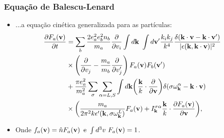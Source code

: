 \documentclass[10pt,aspectratio=1610,lualatex]{beamer}
\begin{document}
\begin{frame}
  \frametitle{Equação de Balescu-Lenard}
  \begin{itemize}
    \item ...a equação cinética generalizada para as partículas:
    \begin{equation}
      \begin{split}
	\frac{\partial F_a({\bf v})}{\partial t}
	&=\sum_b\frac{2e_a^2e_b^2n_b}{m_a}
	\frac{\partial }{\partial v_i}
	\int d{\bf k}\ \int d{\bf v'}\frac{k_ik_j}{k^4}
	\frac{\delta({\bf k \cdot v - k \cdot v'})}
	{|\epsilon({\bf k, k\cdot v})|^2}\\
	&\times \left(\frac{\partial }{\partial v_j}
	  -\frac{m_a}{m_b}\frac{\partial }{\partial v'_j}
	\right)F_a({\bf v})F_b({\bf v'})\\
	&+\frac{\pi e_a^2}{m_a^2}\sum_\sigma\sum_{\alpha=L,S}
	\int d{\bf k} \biggl(\frac{\bf k}{k}
	\cdot\frac{\partial}{\partial{\bf v}}\biggr)
	\delta(\sigma\omega_{\bf k}^\alpha-{\bf k}\cdot{\bf v})\\
	&\times\biggl(\frac{m_a}{2\pi^2k
	  \epsilon '({\bf k},\sigma\omega_{\bf k}^L)} F_a({\bf v})
	+I_{\bf k}^{\sigma\alpha} \frac{\bf k}{k}\cdot
	\frac{\partial F_a({\bf v})}{\partial{\bf v}}\biggr),
      \end{split}
   \label{Fa-gen}
    \end{equation}
  \item Onde $f_a({\bf v})= \hat n F_a({\bf v})\,\, \, \mbox{e}\,\,
    \int d^3v\ F_a({\bf v})=1$.
  \end{itemize}
\end{frame}
\end{document}
